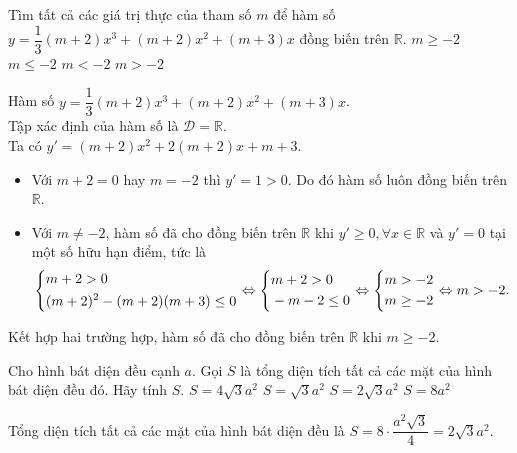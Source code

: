 \begin{ex}%
 Tìm tất cả các giá trị thực của tham số $m$ để hàm số $y = \dfrac{1}{3}(m+2)x^3 + (m+2)x^2 + (m+3)x$ đồng biến trên $\mathbb{R}$.
 \choice
  {\True $m \geq -2$}
  {$m \leq -2$}
  {$m < -2$}
  {$m > -2$}
 \loigiai
  {
  Hàm số $y = \dfrac{1}{3}(m+2)x^3 + (m+2)x^2 + (m+3)x$.\\
  Tập xác định của hàm số là $\mathscr{D} = \mathbb{R}$.\\
  Ta có $y' = (m+2)x^2 + 2(m+2)x + m+3$.
  \begin{itemize}
   \item Với $m + 2 = 0$ hay $m = -2$ thì $y' = 1 >0$. Do đó hàm số luôn đồng biến trên $\mathbb{R}$.
   \item Với $m \neq -2$, hàm số đã cho đồng biến trên $\mathbb{R}$ khi $y' \geq 0, \forall x \in \mathbb{R}$ và $y' = 0$ tại một số hữu hạn điểm, tức là
   \begin{eqnarray*}
    \left\{\begin{aligned}& m + 2 > 0 \\& (m+2)^2 -(m+2)(m+3) \leq 0\end{aligned}\right. \Leftrightarrow \left\{\begin{aligned}& m+2 > 0 \\& -m-2 \leq 0\end{aligned}\right. \Leftrightarrow \left\{\begin{aligned}& m > -2 \\& m \geq -2\end{aligned}\right. \Leftrightarrow m > -2.
   \end{eqnarray*}
  \end{itemize}
  Kết hợp hai trường hợp, hàm số đã cho đồng biến trên $\mathbb{R}$ khi $m \geq -2$.
  }
\end{ex}

\begin{ex}%
 Cho hình bát diện đều cạnh $a$. Gọi $S$ là tổng diện tích tất cả các mặt của hình bát diện đều đó. Hãy tính $S$.
 \choice
  {$S = 4\sqrt{3}a^2$}
  {$S = \sqrt{3}a^2$}
  {\True $S = 2\sqrt{3}a^2$}
  {$S = 8a^2$}
 \loigiai
  {
  \immini
  {  
  Tổng diện tích tất cả các mặt của hình bát diện đều là $S = 8 \cdot \dfrac{a^2\sqrt{3}}{4} = 2\sqrt{3}a^2$.
  }
  {
  }
  }
\end{ex}

